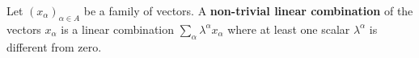 Let $(x_{\alpha})_{\alpha \in A}$ be a family of vectors. A \textbf{non-trivial linear combination} of the vectors $x_{\alpha}$ is a linear combination $\sum_{\alpha} \lambda^{\alpha} x_{\alpha}$ where at least one scalar $\lambda^{\alpha}$ is different from zero.
